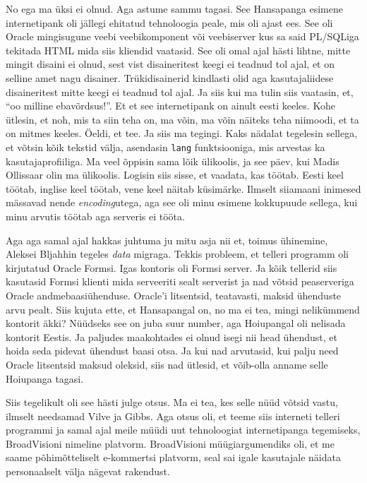 No ega ma üksi ei olnud. Aga astume sammu tagasi. See Hansapanga esimene internetipank oli jällegi ehitatud tehnoloogia peale, mis oli ajast ees. See oli Oracle mingisugune veebi veebikomponent või veebiserver kus sa said PL/SQLiga tekitada HTML mida siis kliendid vaatasid. See oli omal ajal hästi lihtne, mitte mingit disaini ei olnud, sest vist disaineritest keegi ei teadnud tol ajal, et on selline amet nagu disainer. Trükidisainerid kindlasti olid aga kasutajaliidese disaineritest mitte keegi ei teadnud tol ajal. Ja siis kui ma tulin siis vaatasin, et, \enquote{oo milline ebavõrdsus!}. Et et see internetipank on ainult eesti keeles. Kohe ütlesin, et noh, mis ta siin teha on, ma võin, ma võin näiteks teha niimoodi, et ta on mitmes keeles. Öeldi, et tee. Ja siis ma tegingi. Kaks nädalat tegelesin sellega, et võtsin kõik tekstid välja, asendasin \verb|lang| funktsiooniga, mis arvestas ka kasutajaprofiiliga. Ma veel õppisin sama lõik ülikoolis, ja see päev, kui Madis Ollissaar olin ma ülikoolis. Logisin siis sisse, et vaadata, kas töötab. Eesti keel töötab, inglise keel töötab, vene keel näitab küsimärke. Ilmselt siiamaani inimesed mässavad nende \emph{encoding}utega, aga see oli minu esimene kokkupuude sellega, kui minu arvutis töötab aga serveris ei tööta.

Aga aga samal ajal hakkas juhtuma ju mitu asja nii et, toimus ühinemine, Aleksei Bljahhin tegeles \emph{data} migraga. Tekkis probleem, et telleri programm oli kirjutatud Oracle Formsi. Igas kontoris oli Formsi server. Ja kõik tellerid siis kasutasid Formsi klienti mida serveeriti sealt serverist ja nad võtsid peaserveriga Oracle andmebaasiühenduse. Oracle'i litsentsid, teatavasti, maksid ühenduste arvu pealt. Siis kujuta ette, et Hansapangal on, no ma ei tea, mingi nelikümmend kontorit äkki? Nüüdseks see on juba suur number, aga Hoiupangal oli nelisada kontorit Eestis. Ja paljudes maakohtades ei olnud isegi nii head ühendust, et hoida seda pidevat ühendust baasi otsa. Ja kui nad arvutasid, kui palju need Oracle litsentsid maksud oleksid, siis nad ütlesid, et võib-olla anname selle Hoiupanga tagasi. 

Siis tegelikult oli see hästi julge otsus. Ma ei tea, kes selle nüüd võtsid vastu, ilmselt needsamad Vilve ja Gibbs. Aga otsus oli, et teeme siis interneti telleri programmi ja samal ajal meile müüdi uut tehnoloogiat internetipanga tegemiseks, BroadVisioni nimeline platvorm. BroadVisioni müügiargumendiks oli, et me saame põhimõtteliselt e-kommertsi platvorm,  seal sai igale kasutajale näidata personaalselt välja nägevat rakendust.

